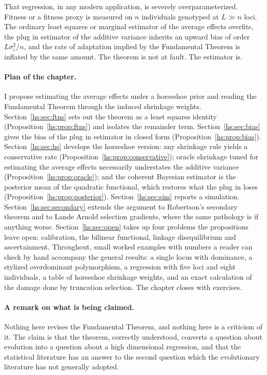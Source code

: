 That regression, in any modern application, is severely overparameterized. Fitness or a fitness proxy is measured on $n$ individuals genotyped at $L \gg n$ loci. The ordinary least squares or marginal estimator of the average effects overfits, the plug in estimator of the additive variance inherits an upward bias of order $L\sigma^2_\varepsilon/n$, and the rate of adaptation implied by the Fundamental Theorem is inflated by the same amount. The theorem is not at fault. The estimator is.

\paragraph{Plan of the chapter.} I propose estimating the average effects under a horseshoe prior \citep{hs:carvalho2010horseshoe,hs:polson2012local} and reading the Fundamental Theorem through the induced shrinkage weights. Section~\ref{hs:sec:ftns} sets out the theorem as a least squares identity (Proposition~\ref{hs:prop:ftns}) and isolates the remainder term. Section~\ref{hs:sec:bias} gives the bias of the plug in estimator in closed form (Proposition~\ref{hs:prop:bias}). Section~\ref{hs:sec:hs} develops the horseshoe version: any shrinkage rule yields a conservative rate (Proposition~\ref{hs:prop:conservative}); oracle shrinkage tuned for estimating the average effects necessarily understates the additive variance (Proposition~\ref{hs:prop:oracle}); and the coherent Bayesian estimator is the posterior mean of the quadratic functional, which restores what the plug in loses (Proposition~\ref{hs:prop:posterior}). Section~\ref{hs:sec:sim} reports a simulation. Section~\ref{hs:sec:secondary} extends the argument to Robertson's secondary theorem and to Lande Arnold selection gradients, where the same pathology is if anything worse. Section~\ref{hs:sec:open} takes up four problems the propositions leave open: calibration, the bilinear functional, linkage disequilibrium and ascertainment. Throughout, small worked examples with numbers a reader can check by hand accompany the general results: a single locus with dominance, a stylized overdominant polymorphism, a regression with five loci and eight individuals, a table of horseshoe shrinkage weights, and an exact calculation of the damage done by truncation selection. The chapter closes with exercises.

\paragraph{A remark on what is being claimed.} Nothing here revises the Fundamental Theorem, and nothing here is a criticism of it. The claim is that the theorem, correctly understood, converts a question about evolution into a question about a high dimensional regression, and that the statistical literature has an answer to the second question which the evolutionary literature has not generally adopted.

